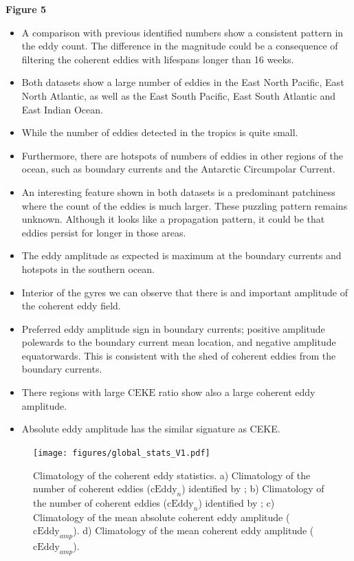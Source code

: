 \documentclass[draft,linenumbers]{agujournal2019}
\newcommand{\CEKE}{\textrm{CEKE}}
\newcommand{\cEddy}{\textrm{cEddy}}
\begin{document}
	\textbf{Figure 5}
	\begin{itemize}
		\item A comparison with previous identified numbers show a consistent pattern in the eddy count. The difference in the magnitude could be a consequence of \citet{Chelton_Global_2007} filtering the coherent eddies with lifespans longer than 16 weeks. 
		\item Both datasets show a large number of eddies in the East North Pacific, East North Atlantic, as well as the East South Pacific, East South Atlantic and East Indian Ocean. 
		\item While the number of eddies detected in the tropics is quite small.
		\item Furthermore, there are hotspots of numbers of eddies in other regions of the ocean, such as boundary currents and the Antarctic Circumpolar Current. 
		\item An interesting feature shown in both datasets is a predominant patchiness where the count of the eddies is much larger. These puzzling pattern remains unknown. Although it looks like a propagation pattern, it could be that eddies persist for longer in those areas.
		\item The eddy amplitude as expected is maximum at the boundary currents and hotspots in the southern ocean.
		\item Interior of the gyres we can observe that there is and important amplitude of the coherent eddy field. 
		\item Preferred eddy amplitude sign in boundary currents; positive amplitude polewards to the boundary current mean location, and negative amplitude equatorwards. This is consistent with the shed of coherent eddies from the boundary currents.
		\item There regions with large $\CEKE$ ratio show also a large coherent eddy amplitude.
		\item Absolute eddy amplitude has the similar signature as CEKE.
	\end{itemize}

	\begin{figure}
	    \centering
	    \texttt{[image: figures/global\_stats\_V1.pdf]}
	    \caption{Climatology of the coherent eddy statistics. a) Climatology of the number of coherent eddies ($\cEddy_n$) identified by \citet{Chelton_Global_2007};  b) Climatology of the number of coherent eddies ($\cEddy_n$) identified by \citet{Martinez_Kinetic_2019}; c) Climatology of the mean absolute coherent eddy amplitude ($\cEddy_{amp}$). d) Climatology of the mean coherent eddy amplitude ($\cEddy_{amp}$).}
	    \label{fig:eddy_stats_climatology}
	\end{figure}
\end{document}

